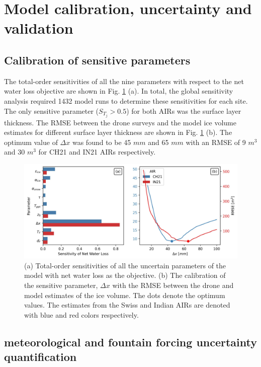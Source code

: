 \section{Model calibration, uncertainty and validation}

\subsection{Calibration of sensitive parameters}

The total-order sensitivities of all the nine parameters with respect to the net water loss objective are shown
in Fig. \ref{fig:param_hist} (a). In total, the global sensitivity analysis required 1432 model runs to determine
these sensitivities for each site. The only sensitive parameter ($S_{T_{j}} > 0.5$) for both \ac{AIRs} was the
surface layer thickness. The RMSE between the drone surveys and the model ice volume estimates for different
surface layer thickness are shown in Fig. \ref{fig:param_hist} (b). The optimum value of $\Delta x$ was found to
be 45 $mm$ and 65 $mm$ with an RMSE of 9 $m^3$ and 30 $m^3$ for CH21 and IN21 \ac{AIRs} respectively.

\begin{figure}
	\centering
	\includegraphics[width=\linewidth]{figs/model_calibration.jpg}
	\caption{(a) Total-order sensitivities of all the uncertain parameters of the model with net water loss as the
		objective. (b) The calibration of the sensitive parameter, $\Delta x$ with the RMSE between the drone and
		model estimates of the ice volume. The dots denote the optimum values. The estimates from the Swiss and Indian
		\ac{AIRs} are denoted with blue and red colors respectively. }
	\label{fig:param_hist}
\end{figure}

\subsection{meteorological and fountain forcing uncertainty quantification}

